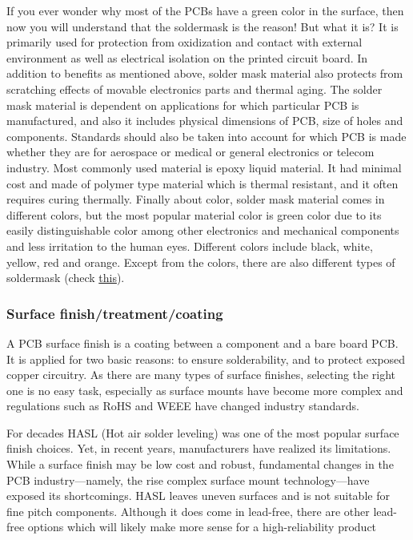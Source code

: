 \documentclass[final]{cubedoc}
\begin{document}
	If you ever wonder why most of the PCBs have a green color in the surface, then now you will understand that the soldermask is the reason! But what it is?
	It is primarily used for protection from oxidization and contact with external environment as well as electrical isolation on the printed circuit board. In addition to benefits as mentioned above, solder mask material also protects from scratching effects of movable electronics parts and thermal aging. The solder mask material is dependent on applications for which particular PCB is manufactured, and also it includes physical dimensions of PCB, size of holes and components. Standards should also be taken into account for which PCB is made whether they are for aerospace or medical or general electronics or telecom industry. Most commonly used material is epoxy liquid material. It had minimal cost and made of polymer type material which is thermal resistant, and it often requires curing thermally. Finally about color, solder mask material comes in different colors, but the most popular material color is green color due to its easily distinguishable color among other electronics and mechanical components and less irritation to the human eyes. Different colors include black, white, yellow, red and orange. Except from the colors, there are also different types of soldermask (check \href{https://www.allpcb.com/soldermask/soldermask_types.html}{this}).
	
	\subsubsection{Surface finish/treatment/coating}
	
	A PCB surface finish is a coating between a component and a bare board PCB. It is applied for two basic reasons: to ensure solderability, and to protect exposed copper circuitry. As there are many types of surface finishes, selecting the right one is no easy task, especially as surface mounts have become more complex and regulations such as RoHS and WEEE have changed industry standards.
	
	For decades HASL (Hot air solder leveling) was one of the most popular surface finish choices. Yet, in recent years, manufacturers have realized its limitations. While a surface finish may be low cost and robust, fundamental changes in the PCB industry—namely, the rise complex surface mount technology—have exposed its shortcomings. HASL leaves uneven surfaces and is not suitable for fine pitch components. Although it does come in lead-free, there are other lead-free options which will likely make more sense for a high-reliability product
	
\end{document}
